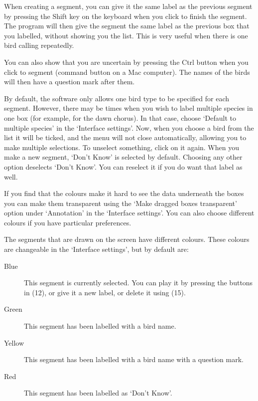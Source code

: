 \documentclass{article}
\begin{document}
When creating a segment, you can give it the same label as the previous segment by pressing the Shift key on the keyboard when you click to finish the segment. The program will then give the segment the same label as the previous box that you labelled, without showing you the list. This is very useful when there is one bird calling repeatedly.

You can also show that you are uncertain by pressing the Ctrl button when you click to segment (command button on a Mac computer). The names of the birds will then have a question mark after them.

By default, the software only allows one bird type to be specified for each segment. However, there may be times when you wish to label multiple species in one box (for example, for the dawn chorus). In that case, choose `Default to multiple species' in the `Interface settings'. Now, when you choose a bird from the list it will be ticked, and the menu will not close automatically, allowing you to make multiple selections. To unselect something, click on it again. When you make a new segment, `Don't Know' is selected by default. Choosing any other option deselects `Don't Know'. You can reselect it if you do want that label as well. 

If you find that the colours make it hard to see the data underneath the boxes you can make them transparent using the `Make dragged boxes transparent' option under `Annotation' in the `Interface settings'. You can also choose different colours if you have particular preferences.



The segments that are drawn on the screen have different colours. These colours are changeable in the `Interface settings', but by default are:
	\begin{description} 
	\item[Blue] This segment is currently selected. You can play it by pressing the buttons in (12), or give it a new label, or delete it using (15). 
	\item[Green] This segment has been labelled with a bird name.
	\item[Yellow] This segment has been labelled with a bird name with a question mark.
	\item[Red] This segment has been labelled as `Don't Know'.
	\end{description}
\end{document}
